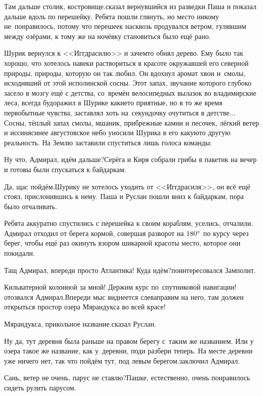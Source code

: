 \diagdash Там дальше столик, костровище.\mdash сказал вернувшийся из разведки Паша и показал дальше вдоль по перешейку. Ребята пошли глянуть, но место никому не~понравилось, потому что перешеек насквозь продувался ветром, гулявшим между озёрами, к тому же на ночёвку становиться было ещё рано. 

Шурик вернулся к <<Иггдрасилю>> и зачем\sdash то обнял дерево. Ему было так хорошо, что хотелось навеки раствориться в красоте окружавшей его северной природы, природы, которую он так любил. Он вдохнул аромат хвои и~смолы, исходивший от этой исполинской сосны. Этот запах, звучание которого глубоко засело в мозгу ещё с детства, со~времён велосипедных вылазок во владимирские леса, всегда будоражил в Шурике какие\sdash то приятные, но в то же время первобытные чувства, заставлял хоть на~секундочку очутиться в детстве$\ldots$ Сосны, тёплый запах смолы, мшаник, прибрежные камни и песочек, лёгкий ветер и иссиня\sdash синее августовское небо уносили Шурика в его какую\sdash то другую реальность. На Землю заставили спуститься лишь голоса команды:

\diagdash Ну что, Адмирал, идём дальше?\mdash Серёга и Киря собрали грибы в пакетик на вечер и готовы были спускаться к байдаркам.

\diagdash Да, щас пойдём.\mdash Шурику не хотелось уходить от <<Иггдрасиля>>, он всё ещё стоял, прислонившись к нему. Паша и Руслан пошли вниз к байдаркам, пора было отчаливать.

Ребята аккуратно спустились с перешейка к своим кораблям, уселись, отчалили. Адмирал отходил от берега кормой, совершая разворот на $180\degree$ по курсу через берег, чтобы ещё раз окинуть взором шикарной красоты место, которое они покидали. 

\diagdash Тащ Адмирал, впереди просто Атлантика! Куда идём?\mdash поинтересовался Замполит.

\diagdash Кильватерной колонной за мной! Держим курс по~спутниковой навигации!\mdash отозвался Адмирал.\mdash Впереди мыс виднеется слева\mdash правим на него, там должен открыться простор озера Мярандукса во всей красе!

\diagdash Мярандукса, прикольное название.\mdash сказал Руслан.

\diagdash Ну да, тут деревня была раньше на правом берегу с~таким же названием. Или у озера такое же название, как у~деревни, поди разбери теперь. На месте деревни уже ничего нет, так что пойдём тут, под левым берегом.\mdash заключил Адмирал.

\diagdash Сань, ветер не очень, парус не ставлю?\mdash Пашке, естественно, очень понравилось сидеть рулить парусом.

